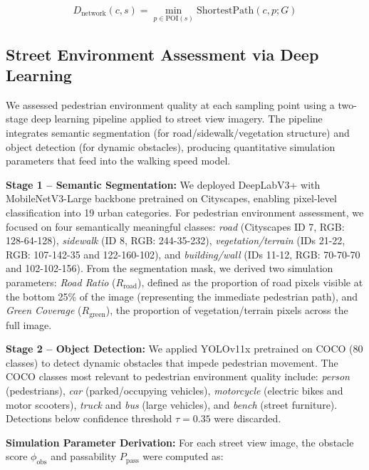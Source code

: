 \documentclass[10pt,conference,compsoc]{IEEEtran}
\begin{document}
\begin{equation}
D_{\text{network}}(c, s) = \min_{p \in \text{POI}(s)} \text{ShortestPath}(c, p; G)
\label{eq:network_dist}
\end{equation}

\subsection{Street Environment Assessment via Deep Learning}

We assessed pedestrian environment quality at each sampling point using a two-stage deep learning pipeline applied to street view imagery. The pipeline integrates semantic segmentation (for road/sidewalk/vegetation structure) and object detection (for dynamic obstacles), producing quantitative simulation parameters that feed into the walking speed model.

\textbf{Stage 1 -- Semantic Segmentation:} We deployed DeepLabV3+ with MobileNetV3-Large backbone \cite{chen2018encoder} pretrained on Cityscapes, enabling pixel-level classification into 19 urban categories. For pedestrian environment assessment, we focused on four semantically meaningful classes: \emph{road} (Cityscapes ID 7, RGB: 128-64-128), \emph{sidewalk} (ID 8, RGB: 244-35-232), \emph{vegetation/terrain} (IDs 21-22, RGB: 107-142-35 and 122-160-102), and \emph{building/wall} (IDs 11-12, RGB: 70-70-70 and 102-102-156). From the segmentation mask, we derived two simulation parameters: \emph{Road Ratio} ($R_{\text{road}}$), defined as the proportion of road pixels visible at the bottom 25\% of the image (representing the immediate pedestrian path), and \emph{Green Coverage} ($R_{\text{green}}$), the proportion of vegetation/terrain pixels across the full image.

\textbf{Stage 2 -- Object Detection:} We applied YOLOv11x \cite{jocher2022yolo} pretrained on COCO (80 classes) to detect dynamic obstacles that impede pedestrian movement. The COCO classes most relevant to pedestrian environment quality include: \emph{person} (pedestrians), \emph{car} (parked/occupying vehicles), \emph{motorcycle} (electric bikes and motor scooters), \emph{truck} and \emph{bus} (large vehicles), and \emph{bench} (street furniture). Detections below confidence threshold $\tau = 0.35$ were discarded.

\textbf{Simulation Parameter Derivation:} For each street view image, the obstacle score $\phi_{\text{obs}}$ and passability $P_{\text{pass}}$ were computed as:
\end{document}
